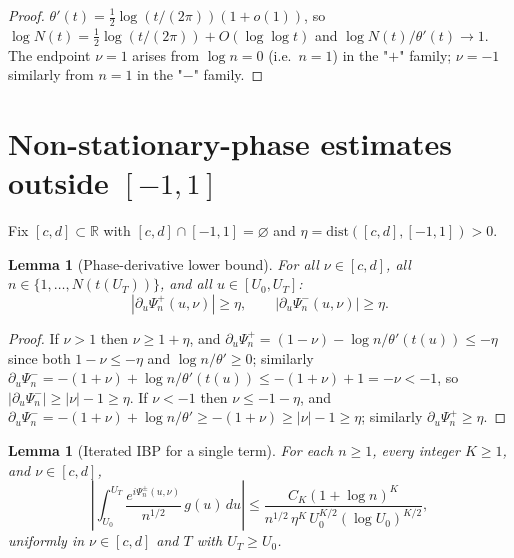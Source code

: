 \documentclass[11pt]{article}
\newtheorem{lemma}[theorem]{Lemma}
\theoremstyle{definition}
\theoremstyle{remark}
\begin{document}
\begin{proof}
$\theta'(t)=\tfrac12\log(t/(2\pi))(1+o(1))$, so
$\log N(t)=\tfrac12\log(t/(2\pi))+O(\log\log t)$ and
$\log N(t)/\theta'(t)\to 1$.  The endpoint $\nu=1$ arises from
$\log n=0$ (i.e.\ $n=1$) in the "$+$" family; $\nu=-1$ similarly from
$n=1$ in the "$-$" family.
\end{proof}

\section{Non-stationary-phase estimates outside $[-1,1]$}

Fix $[c,d]\subset\mathbb{R}$ with $[c,d]\cap[-1,1]=\varnothing$ and
$\eta=\mathrm{dist}([c,d],[-1,1])>0$.

\begin{lemma}[Phase-derivative lower bound]\label{lem:lower}
For all $\nu\in[c,d]$, all $n\in\{1,\dots,N(t(U_T))\}$, and all
$u\in[U_0,U_T]$:
\[
  |\partial_u\Psi_n^+(u,\nu)|\ge\eta,\qquad
  |\partial_u\Psi_n^-(u,\nu)|\ge\eta.
\]
\end{lemma}

\begin{proof}
If $\nu>1$ then $\nu\ge 1+\eta$, and
$\partial_u\Psi_n^+=(1-\nu)-\log n/\theta'(t(u))\le-\eta$ since both
$1-\nu\le-\eta$ and $\log n/\theta'\ge 0$; similarly
$\partial_u\Psi_n^-=-(1+\nu)+\log n/\theta'(t(u))\le-(1+\nu)+1=-\nu<-1$,
so $|\partial_u\Psi_n^-|\ge|\nu|-1\ge\eta$.  If $\nu<-1$ then
$\nu\le-1-\eta$, and $\partial_u\Psi_n^-=-(1+\nu)+\log n/\theta'\ge
-(1+\nu)\ge|\nu|-1\ge\eta$; similarly $\partial_u\Psi_n^+\ge\eta$.
\end{proof}

\begin{lemma}[Iterated IBP for a single term]\label{lem:IBP}
For each $n\ge 1$, every integer $K\ge 1$, and $\nu\in[c,d]$,
\begin{equation}\label{eq:IBPbd}
  \left|\int_{U_0}^{U_T}\frac{e^{i\Psi_n^\pm(u,\nu)}}{n^{1/2}}\,g(u)\,du\right|
  \le\frac{C_K(1+\log n)^K}{n^{1/2}\,\eta^K\,U_0^{K/2}(\log U_0)^{K/2}},
\end{equation}
uniformly in $\nu\in[c,d]$ and $T$ with $U_T\ge U_0$.
\end{lemma}
\end{document}
